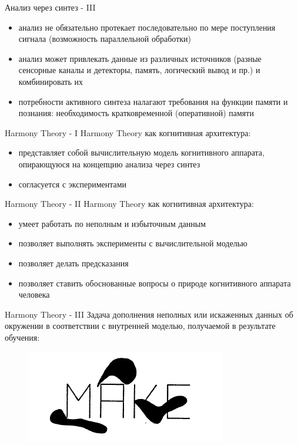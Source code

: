 \documentclass{beamer}
\begin{document}
\begin{frame}{Анализ через синтез - III}
\begin{itemize}
	\item анализ не обязательно протекает последовательно по мере поступления сигнала (возможность параллельной обработки)
	\medskip
	\item анализ может привлекать данные из различных источников (разные сенсорные каналы и детекторы, память, логический вывод и пр.) и комбинировать их
	\item потребности активного синтеза налагают требования на функции памяти и познания: необходимость кратковременной (оперативной) памяти
\end{itemize}
\end{frame}

\begin{frame}{Harmony Theory - I}
Harmony Theory как когнитивная архитектура:
\bigskip
\begin{itemize}
	\item представляет собой вычислительную модель когнитивного аппарата, опирающуюся на концепцию анализа через синтез
	\medskip
	\item согласуется с экспериментами
\end{itemize}
\end{frame}

\begin{frame}{Harmony Theory - II}
Harmony Theory как когнитивная архитектура:
\bigskip
\begin{itemize}
	\item умеет работать по неполным и избыточным данным
	\medskip
	\item позволяет выполнять эксперименты с вычислительной моделью
	\medskip
	\item позволяет делать предсказания
	\medskip
	\item позволяет ставить обоснованные вопросы о природе когнитивного аппарата человека
\end{itemize}
\end{frame}

\begin{frame}{Harmony Theory - III}
Задача дополнения неполных или искаженных данных об окружении в соответствии с внутренней моделью, получаемой в результате обучения:
\bigskip
\begin{center}
	\begin{figure}[H]
		\includegraphics[scale=0.5]{completion_task.png} 
	\end{figure}
\end{center}
\end{frame}
\end{document}
